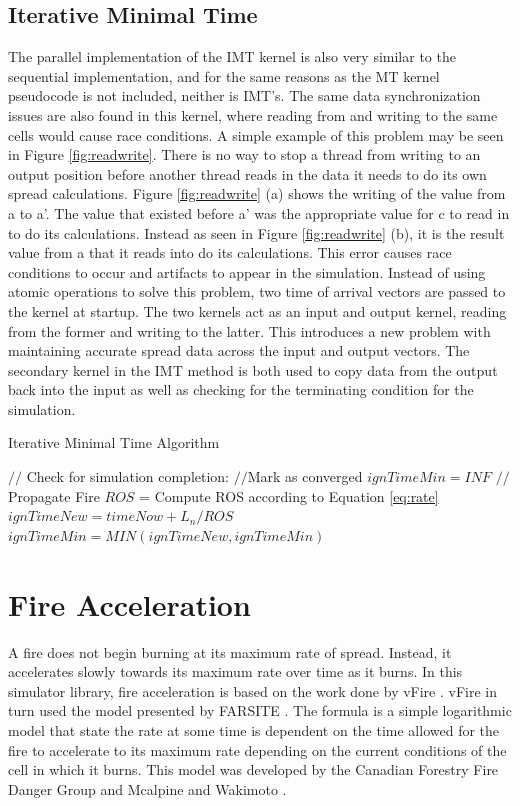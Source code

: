 \subsection{Iterative Minimal Time}
The parallel implementation of the IMT kernel is also very similar to the sequential implementation, and for the same reasons as the MT kernel pseudocode is not included, neither is IMT's. The same data synchronization issues are also found in this kernel, where reading from and writing to the same cells would cause race conditions. A simple example of this problem may be seen in Figure \ref{fig:readwrite}. There is no way to stop a thread from writing to an output position before another thread reads in the data it needs to do its own spread calculations. Figure \ref{fig:readwrite} (a) shows the writing of the value from a to a'. The value that existed before a' was the appropriate value for c to read in to do its calculations. Instead as seen in Figure \ref{fig:readwrite} (b), it is the result value from a that it reads into do its calculations. This error causes race conditions to occur and artifacts to appear in the simulation. Instead of using atomic operations to solve this problem, two time of arrival vectors are passed to the kernel at startup. The two kernels act as an input and output kernel, reading from the former and writing to the latter. This introduces a new problem with maintaining accurate spread data across the input and output vectors. The secondary kernel in the IMT method is both used to copy data from the output back into the input as well as checking for the terminating condition for the simulation. 

\begin{algorithm}[H]
  \caption{Iterative Minimal Time Algorithm}
  \label{alg:IMT}
  \begin{algorithmic}
  \STATE $//$ Check for simulation completion:
  \STATE $//$Mark as converged
  \ENDIF
  \STATE $ignTimeMin = INF$
  \STATE $//$Propagate Fire
  \STATE $ROS$ = Compute ROS according to Equation \ref{eq:rate}
  \STATE $ignTimeNew = timeNow + L_n / ROS$
  \STATE $ignTimeMin = MIN(ignTimeNew, ignTimeMin)$
  \ENDFOR
  \ENDIF
  \ENDFOR
  \end{algorithmic}
\end{algorithm}

\section{Fire Acceleration}
A fire does not begin burning at its maximum rate of spread. Instead, it accelerates slowly towards its maximum rate over time as it burns. In this simulator library, fire acceleration is based on the work done by vFire \cite{vFire}. vFire in turn used the model presented by FARSITE \cite{FARSITE}. The formula is a simple logarithmic model that state the rate at some time is dependent on the time allowed for the fire to accelerate to its maximum rate depending on the current conditions of the cell in which it burns. This model was developed by the Canadian Forestry Fire Danger Group and Mcalpine and Wakimoto \cite{accel_canada,accel_mcalpine}. 

